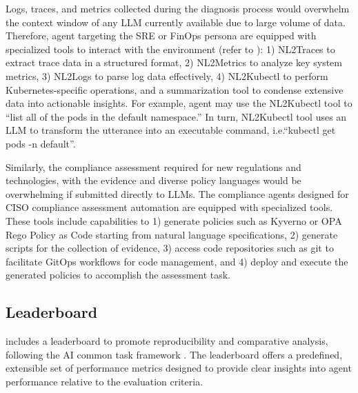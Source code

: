 Logs, traces, and metrics collected during the diagnosis process would overwhelm the context window of any LLM currently available due to large volume of data. Therefore, agent targeting the SRE or FinOps persona are equipped with specialized tools to interact with the environment (refer to ): 1) NL2Traces to extract trace data in a structured format, 2) NL2Metrics to analyze key system metrics, 3) NL2Logs to parse log data effectively, 4) NL2Kubectl to perform Kubernetes-specific operations, and a summarization tool to condense extensive data into actionable insights. For example, agent may use the NL2Kubectl tool to ``list all of the pods in the default namespace.'' In turn, NL2Kubectl tool uses an LLM to transform the utterance into an executable command, i.e.``kubectl get pods -n default''. 

Similarly, the compliance assessment required for new regulations and technologies, with the evidence and diverse policy languages would be overwhelming if submitted directly to LLMs. 
The compliance agents designed for CISO compliance assessment automation are equipped with specialized tools. 
These tools include capabilities to 1) generate policies such as Kyverno or OPA Rego Policy as Code starting from natural language specifications, 2) generate scripts for the collection of evidence, 3) access code repositories such as git to facilitate GitOps workflows for code management, and 4) deploy and execute the generated policies to accomplish the assessment task. %


 































    
    




\subsection{Leaderboard} 
\bench includes a leaderboard to promote reproducibility and comparative analysis, following the AI common task framework  \cite{Donoho2019,VarshneyKS2019}. %
The leaderboard offers a predefined, extensible set of performance metrics designed to provide clear insights into agent performance relative to the evaluation criteria.


